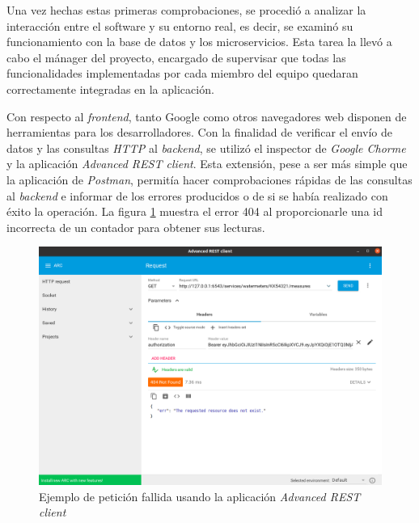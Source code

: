\documentclass[pdftex,11pt,a4paper]{book}
\begin{document}
Una vez hechas estas primeras comprobaciones, se procedió a analizar la interacción entre el software y su entorno real, es decir, se examinó su funcionamiento con la base de datos y los microservicios. Esta tarea la llevó a cabo el mánager del proyecto, encargado de supervisar que todas las funcionalidades implementadas por cada miembro del equipo quedaran correctamente integradas en la aplicación.


Con respecto al \textit{frontend}, tanto Google como otros navegadores web disponen de herramientas para los desarrolladores. Con la finalidad de verificar el envío de datos y las consultas \textit{HTTP} al \textit{backend}, se utilizó el inspector de \textit{Google Chorme} y la aplicación \textit{Advanced REST client}. Esta extensión, pese a ser más simple que la aplicación de \textit{Postman}, permitía hacer comprobaciones rápidas de las consultas al \textit{backend} e informar de los errores producidos o de si se había realizado con éxito la operación. La figura \ref{fig:pruebas} muestra el error 404 al proporcionarle una id incorrecta de un contador para obtener sus lecturas.

 \begin{figure}[h]
 \centering
 \includegraphics [scale=0.35] {images/implementacion/pruebas.png}
 \caption{Ejemplo de petición fallida usando la aplicación \textit{Advanced REST client}} 
 \label{fig:pruebas}
 \end{figure}







\end{document}
